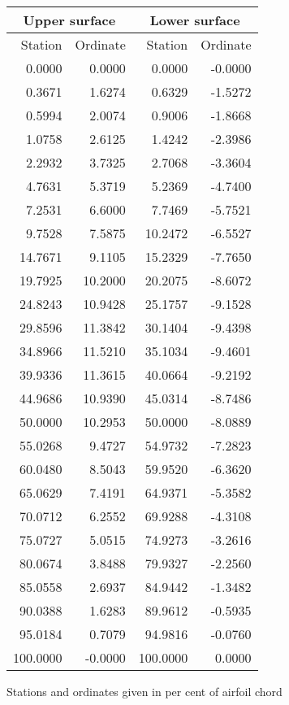 \documentclass[11pt]{book}
\begin{document}
 \hspace{4mm}
 \begin{tabular}{|r|r|r|r|} \hline 
 \multicolumn{2}{|c|}{Upper surface} & \multicolumn{2}{|c|}{Lower surface} \\
 \hline
 Station & Ordinate & Station & Ordinate \\
 \hline
0.0000 & 0.0000 & 0.0000 & -0.0000 \\
0.3671 & 1.6274 & 0.6329 & -1.5272 \\
0.5994 & 2.0074 & 0.9006 & -1.8668 \\
1.0758 & 2.6125 & 1.4242 & -2.3986 \\
2.2932 & 3.7325 & 2.7068 & -3.3604 \\
4.7631 & 5.3719 & 5.2369 & -4.7400 \\
7.2531 & 6.6000 & 7.7469 & -5.7521 \\
9.7528 & 7.5875 & 10.2472 & -6.5527 \\
14.7671 & 9.1105 & 15.2329 & -7.7650 \\
19.7925 & 10.2000 & 20.2075 & -8.6072 \\
24.8243 & 10.9428 & 25.1757 & -9.1528 \\
29.8596 & 11.3842 & 30.1404 & -9.4398 \\
34.8966 & 11.5210 & 35.1034 & -9.4601 \\
39.9336 & 11.3615 & 40.0664 & -9.2192 \\
44.9686 & 10.9390 & 45.0314 & -8.7486 \\
50.0000 & 10.2953 & 50.0000 & -8.0889 \\
55.0268 & 9.4727 & 54.9732 & -7.2823 \\
60.0480 & 8.5043 & 59.9520 & -6.3620 \\
65.0629 & 7.4191 & 64.9371 & -5.3582 \\
70.0712 & 6.2552 & 69.9288 & -4.3108 \\
75.0727 & 5.0515 & 74.9273 & -3.2616 \\
80.0674 & 3.8488 & 79.9327 & -2.2560 \\
85.0558 & 2.6937 & 84.9442 & -1.3482 \\
90.0388 & 1.6283 & 89.9612 & -0.5935 \\
95.0184 & 0.7079 & 94.9816 & -0.0760 \\
100.0000 & -0.0000 & 100.0000 & 0.0000 \\
 \hline 
 \end{tabular}
 \vspace{8mm}

Stations and ordinates given in per cent of airfoil chord
\end{document}
